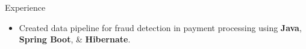 \documentclass{resume} %
\begin{document}
\begin{workSection}{Experience}
	
	\experienceItem[
	company=Capital One,
	location=McLean{,} VA,
	position=Software Engineering Intern,
	duration= June 2025 - present,
	]
	\begin{itemize}
		\vspace{-0.5em}
		\itemsep -6pt {}
		\item Created data pipeline for fraud detection in payment processing using \textbf{Java}, \textbf{Spring Boot}, \& \textbf{Hibernate}.
	\end{itemize}
	
	

\end{workSection}
\end{document}
